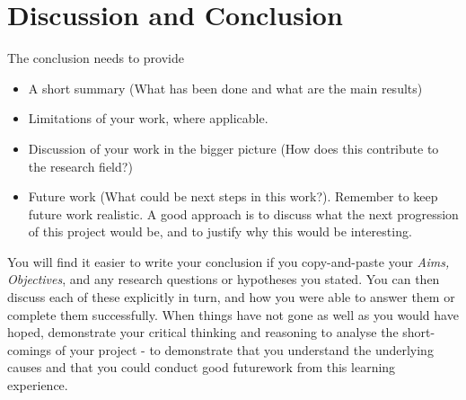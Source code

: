 \chapter{Discussion and Conclusion}
The conclusion needs to provide
\begin{itemize}
    \item A short summary (What has been done and what are the main results)
    \item Limitations of your work, where applicable. 
    \item Discussion of your work in the bigger picture (How does this contribute to the research field?)
    \item Future work (What could be next steps in this work?).  Remember to keep future work realistic.  A good approach is to discuss what the next progression of this project would be, and to justify why this would be interesting.  
\end{itemize}

You will find it easier to write your conclusion if you copy-and-paste your \emph{Aims, Objectives}, and any research questions or hypotheses you stated.  You can then discuss each of these explicitly in turn, and how you were able to answer them or complete them successfully.  When things have not gone as well as you would have hoped, demonstrate your critical thinking and reasoning to analyse the short-comings of your project - to demonstrate that you understand the underlying causes and that you could conduct good futurework from this learning experience.  